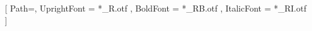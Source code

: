 \setmainfont{LinBiolinum}[
Path=,
UprightFont = *_R.otf ,
BoldFont = *_RB.otf ,
ItalicFont = *_RI.otf
]



\author[Atkey]{Dr.~Robert Atkey}
\date[]{}

\newcommand{\weeksection}[1]{%
  \section{\thetitle{}, Part~\thesection : #1}
  \begin{frame}
    \begin{center}
      \textcolor{black!60}{\thetitle{}, Part \thesection}\\
      {\Huge #1}
    \end{center}
  \end{frame}}

\newcommand{\weektitle}[2]{\def\thetitle{#2}
\title[CS208 - Week #1]{CS208 (Semester 1) Week #1 : #2}}

\newcommand{\assigned}{:}

\newcommand{\forcedto}{\assigned_f}
\newcommand{\decideto}{\assigned_d}
